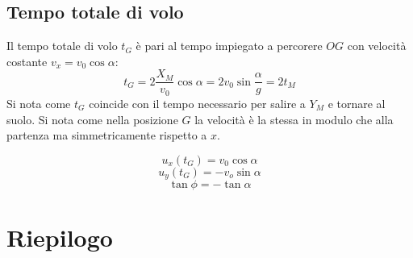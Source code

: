 \documentclass[class=book, crop=false, oneside, 12pt]{standalone}
\begin{document}
	\subsection{Tempo totale di volo}
	Il tempo totale di volo $t_G$ \`e pari al tempo impiegato a percorere $OG$ con velocit\`a costante $v_x=v_0\cos\alpha$:
	$$t_G=2\dfrac{X_M}{v_0}\cos\alpha=2v_0\sin\dfrac{\alpha}{g}=2t_M$$
	Si nota come $t_G$ coincide con il tempo necessario per salire a $Y_M$ e tornare al suolo.
	Si nota come nella posizione $G$ la velocit\`a \`e la stessa in modulo che alla partenza ma simmetricamente rispetto a $x$.
  \begin{multicols}{3}
    \noindent
    $$u_x(t_G)=v_0\cos\alpha$$
    $$u_y(t_G)=-v_o\sin\alpha$$
    $$\tan\phi=-\tan\alpha$$
  \end{multicols}
\section{Riepilogo}
\end{document}
